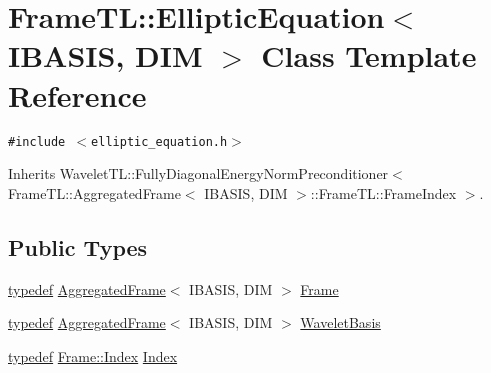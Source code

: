 \hypertarget{classFrameTL_1_1EllipticEquation}{
\section{FrameTL::EllipticEquation$<$ IBASIS, DIM $>$ Class Template Reference}
\label{classFrameTL_1_1EllipticEquation}
}
{\tt \#include $<$elliptic\_\-equation.h$>$}

Inherits WaveletTL::FullyDiagonalEnergyNormPreconditioner$<$ FrameTL::AggregatedFrame$<$ IBASIS, DIM $>$::FrameTL::FrameIndex $>$.

\subsection*{Public Types}
\begin{CompactItemize}
\item 
\hyperlink{structtypedef}{typedef} \hyperlink{classFrameTL_1_1AggregatedFrame}{AggregatedFrame}$<$ IBASIS, DIM $>$ \hyperlink{classFrameTL_1_1EllipticEquation_65fa5216492c8a03f841cf910182a00c}{Frame}
\item 
\hyperlink{structtypedef}{typedef} \hyperlink{classFrameTL_1_1AggregatedFrame}{AggregatedFrame}$<$ IBASIS, DIM $>$ \hyperlink{classFrameTL_1_1EllipticEquation_44b9abebf9c101271d3ddec1ce3ffd3a}{WaveletBasis}
\item 
\hyperlink{structtypedef}{typedef} \hyperlink{classFrameTL_1_1FrameIndex}{Frame::Index} \hyperlink{classFrameTL_1_1EllipticEquation_598c5b4d850e49947abc0a253298e94c}{Index}
\end{CompactItemize}
